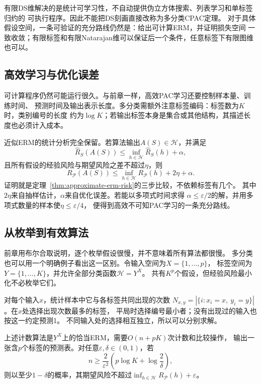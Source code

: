 有限DS维解决的是统计可学习性，不自动提供伪立方体搜索、列表学习和单标签归约的
可执行程序。因此不能把DS刻画直接改称为多分类CPAC定理。
对于具体假设空间，一条可验证的充分路线仍然是：给出可计算ERM，并证明损失空间
一致收敛；有限标签和有限Natarajan维可以保证后一个条件，任意标签下有限图维也可以。

\subsection{高效学习与优化误差}

可计算程序仍然可能运行很久。与前章一样，高效PAC学习还要控制样本量、训练时间、
预测时间及输出表示长度。多分类需额外注意标签编码：标签数为$K$时，类别编号的长度
约为$\log K$；若输出标签本身是集合或其他结构，其描述长度也必须计入成本。

近似ERM的统计分析完全保留。若算法输出$A(S)\in\mathcal H$，并满足
\[
 \hat R_S(A(S))\leq\inf_{h\in\mathcal H}\hat R_S(h)+\alpha,
\]
且所有假设的经验风险与期望风险之差不超过$\eta$，则
\[
 R_{\mathcal P}(A(S))\leq\inf_{h\in\mathcal H}R_{\mathcal P}(h)+2\eta+\alpha.
\]
证明就是定理~\ref{thm:approximate-erm-risk}的三步比较，不依赖标签有几个。
其中$2\eta$来自抽样估计，$\alpha$来自优化误差。若能以多项式时间求得
$\alpha\leq\varepsilon/2$的解，并用多项式数量的样本使$\eta\leq\varepsilon/4$，
便得到高效不可知PAC学习的一条充分路线。

\subsection{从枚举到有效算法}

前章用布尔合取说明，逐个枚举假设很慢，并不意味着所有算法都很慢。
多分类也可以用一个明确例子看出这一区别。令输入空间为$X=\{1,\ldots,p\}$，
标签空间为$Y=\{1,\ldots,K\}$，并允许全部分类函数$\mathcal H=Y^X$。
共有$K^p$个假设，但经验风险最小化不必枚举它们。

对每个输入$x$，统计样本中它与各标签共同出现的次数
$N_{x,y}=|\{i:x_i=x,\ y_i=y\}|$。在$x$处选择出现次数最多的标签，
平局时选择编号最小者；没有出现过的输入也按这一约定预测1。
不同输入处的选择相互独立，所以可以分别求解。

\begin{theorem}[有限输入上的多分类表学习]
\label{thm:multiclass-table-erm}
上述计数算法是$Y^X$上的恰当ERM，需要$O(n+pK)$次计数和比较操作，
输出一张含$p$个标签的预测表。对任意$\varepsilon,\delta\in(0,1)$，若
\[
 n\geq\frac{2}{\varepsilon^2}
       \left(p\log K+\log\frac2\delta\right),
\]
则以至少$1-\delta$的概率，其期望风险不超过$\inf_{h\in\mathcal H}R_{\mathcal P}(h)+\varepsilon$。
\end{theorem}

